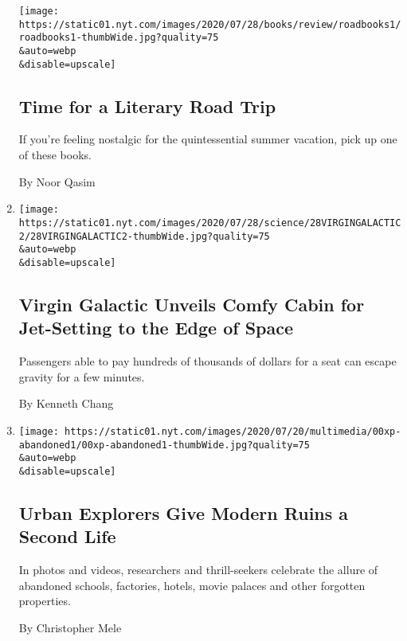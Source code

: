 \begin{enumerate}
  \texttt{[image: https://static01.nyt.com/images/2020/07/28/books/review/roadbooks1/roadbooks1-thumbWide.jpg?quality=75\\\&auto=webp\\\&disable=upscale]}

  \hypertarget{time-for-a-literary-road-trip}{%
  \subsection{Time for a Literary Road
  Trip}\label{time-for-a-literary-road-trip}}

  If you're feeling nostalgic for the quintessential summer vacation,
  pick up one of these books.

  By Noor Qasim
\item
  \href{/2020/07/28/science/virgin-galactic-cabin.html}{}

  \texttt{[image: https://static01.nyt.com/images/2020/07/28/science/28VIRGINGALACTIC2/28VIRGINGALACTIC2-thumbWide.jpg?quality=75\\\&auto=webp\\\&disable=upscale]}

  \hypertarget{virgin-galactic-unveils-comfy-cabin-for-jet-setting-to-the-edge-of-space}{%
  \subsection{Virgin Galactic Unveils Comfy Cabin for Jet-Setting to the
  Edge of
  Space}\label{virgin-galactic-unveils-comfy-cabin-for-jet-setting-to-the-edge-of-space}}

  Passengers able to pay hundreds of thousands of dollars for a seat can
  escape gravity for a few minutes.

  By Kenneth Chang
\item
  \href{/2020/07/27/us/abandoned-properties-to-explore.html}{}

  \texttt{[image: https://static01.nyt.com/images/2020/07/20/multimedia/00xp-abandoned1/00xp-abandoned1-thumbWide.jpg?quality=75\\\&auto=webp\\\&disable=upscale]}

  \hypertarget{urban-explorers-give-modern-ruins-a-second-life}{%
  \subsection{Urban Explorers Give Modern Ruins a Second
  Life}\label{urban-explorers-give-modern-ruins-a-second-life}}

  In photos and videos, researchers and thrill-seekers celebrate the
  allure of abandoned schools, factories, hotels, movie palaces and
  other forgotten properties.

  By Christopher Mele
\end{enumerate}

